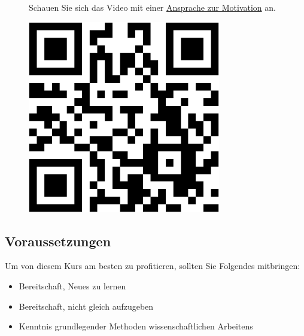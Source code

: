 \documentclass[
  a4paper,
]{scrbook}
\providecommand{\tightlist}{%
  \setlength{\itemsep}{0pt}\setlength{\parskip}{0pt}}\usepackage{longtable,booktabs,array}
\theoremstyle{definition}
\theoremstyle{definition}
\theoremstyle{definition}
\theoremstyle{remark}
\begin{document}
\begin{figure}

\begin{minipage}{0.80\linewidth}
Schauen Sie sich das Video mit einer
\href{https://youtu.be/jtNlzpcPr5Y}{Ansprache zur Motivation}
an.\end{minipage}%
%
\begin{minipage}{0.20\linewidth}

\begin{center}
\includegraphics[width=0.75\textwidth,height=\textheight]{index_files/figure-pdf/unnamed-chunk-2-1.pdf}
\end{center}

\end{minipage}%

\end{figure}%

\subsection{Voraussetzungen}\label{voraussetzungen}

Um von diesem Kurs am besten zu profitieren, sollten Sie Folgendes
mitbringen:

\begin{itemize}
\tightlist
\item
  Bereitschaft, Neues zu lernen
\item
  Bereitschaft, nicht gleich aufzugeben
\item
  Kenntnis grundlegender Methoden wissenschaftlichen Arbeitens
\end{itemize}
\end{document}
